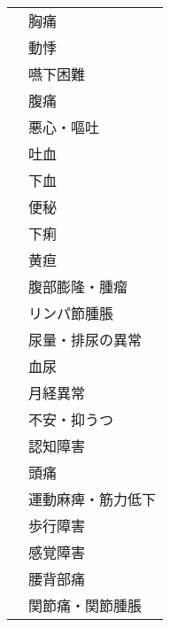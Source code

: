 \begin{xltabular}{\linewidth}{XX}
 & 胸痛 \\
 & 動悸 \\
 & 嚥下困難 \\
 & 腹痛 \\
 & 悪心・嘔吐 \\
 & 吐血 \\
 & 下血 \\
 & 便秘 \\
 & 下痢 \\
 & 黄疸 \\
 & 腹部膨隆・腫瘤 \\
 & リンパ節腫脹 \\
 & 尿量・排尿の異常 \\
 & 血尿 \\
 & 月経異常 \\
 & 不安・抑うつ \\
 & 認知障害 \\
 & 頭痛 \\
 & 運動麻痺・筋力低下 \\
 & 歩行障害 \\
 & 感覚障害 \\
 & 腰背部痛 \\
 & 関節痛・関節腫脹 \\
\bottomrule
\end{xltabular}



